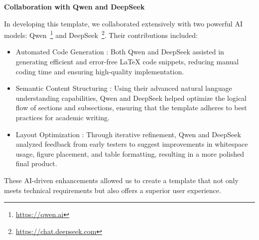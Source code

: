 \textbf{Collaboration with Qwen and DeepSeek}

In developing this template, we collaborated extensively with two powerful AI models: Qwen~\footnote{\url{https://qwen.ai}} and DeepSeek~\footnote{\url{https://chat.deepseek.com}}. Their contributions included:

\begin{itemize}[leftmargin=7mm,itemsep=2mm, topsep=0em]
    \item[1.] Automated Code Generation : Both Qwen and DeepSeek assisted in generating efficient and error-free LaTeX code snippets, reducing manual coding time and ensuring high-quality implementation.
    
    \item[2.] Semantic Content Structuring : Using their advanced natural language understanding capabilities, Qwen and DeepSeek helped optimize the logical flow of sections and subsections, ensuring that the template adheres to best practices for academic writing.
    
    \item[3.] Layout Optimization : Through iterative refinement, Qwen and DeepSeek analyzed feedback from early testers to suggest improvements in whitespace usage, figure placement, and table formatting, resulting in a more polished final product.
\end{itemize}

These AI-driven enhancements allowed us to create a template that not only meets technical requirements but also offers a superior user experience.

